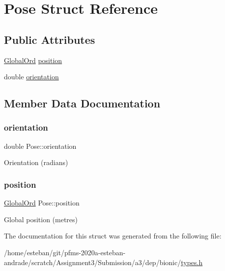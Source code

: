\hypertarget{structPose}{}\section{Pose Struct Reference}
\label{structPose}
\subsection*{Public Attributes}
\begin{DoxyCompactItemize}
\item 
\hyperlink{structGlobalOrd}{Global\+Ord} \hyperlink{structPose_aba2eb8f799d1d392757d6c9490179720}{position}
\item 
double \hyperlink{structPose_a94d058eaab99263c6ab43bf53f4ebd9a}{orientation}
\end{DoxyCompactItemize}


\subsection{Member Data Documentation}
\mbox{\label{structPose_a94d058eaab99263c6ab43bf53f4ebd9a}} 
\subsubsection{\texorpdfstring{orientation}{orientation}}
{\footnotesize\ttfamily double Pose\+::orientation}

Orientation (radians) \mbox{\label{structPose_aba2eb8f799d1d392757d6c9490179720}} 
\subsubsection{\texorpdfstring{position}{position}}
{\footnotesize\ttfamily \hyperlink{structGlobalOrd}{Global\+Ord} Pose\+::position}

Global position (metres) 

The documentation for this struct was generated from the following file\+:\begin{DoxyCompactItemize}
\item 
/home/esteban/git/pfms-\/2020a-\/esteban-\/andrade/scratch/\+Assignment3/\+Submission/a3/dep/bionic/\hyperlink{bionic_2types_8h}{types.\+h}\end{DoxyCompactItemize}
